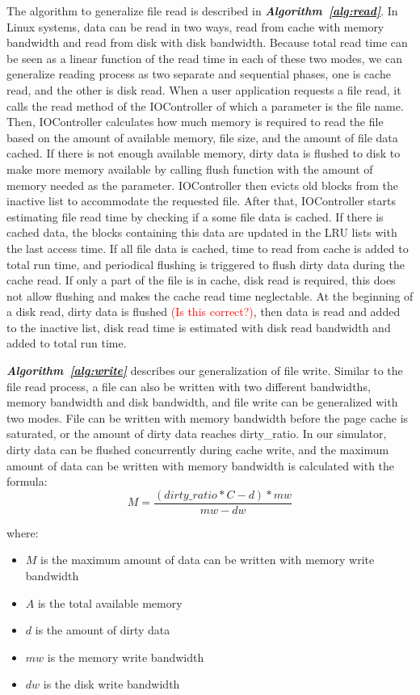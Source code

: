 \documentclass[conference]{IEEEtran}
\begin{document}
			The algorithm to generalize file read is described in \textbf{\textit{Algorithm~\ref{alg:read}}}. In Linux systems, data can be read in two ways, read from cache with memory bandwidth and read from disk with disk bandwidth. Because total read time can be seen as a linear function of the read time in each of these two modes, we can generalize reading process as two separate and sequential phases, one is cache read, and the other is disk read. When a user application requests a file read, it calls the read method of the IOController of which a parameter is the file name. Then, IOController calculates how much memory is required to read the file based on the amount of available memory, file size, and the amount of file data cached. If there is not enough available memory, dirty data is flushed to disk to make more memory available by calling flush function with the amount of memory needed as the parameter. IOController then evicts old  blocks from the inactive list to accommodate the requested file. After that, IOController starts estimating file read time by checking if a some file data is cached. If there is cached data, the blocks containing this data are  updated in the LRU lists with the last access time. If all file data is cached, time to read from cache is added to total run time, and periodical flushing is triggered to flush dirty data during the cache read. If only a part of the file is in cache, disk read is required, this does not allow flushing and makes the cache read time neglectable. At the beginning of a disk read, dirty data is flushed \textcolor{red}{(Is this correct?)}, then data is read and added to the inactive list, disk read time is estimated with disk read bandwidth and added to total run time. 			

			\textbf{\textit{Algorithm~\ref{alg:write}}} describes our generalization of file write. Similar to the file read process, a file can also be written with two different bandwidths, memory bandwidth and disk bandwidth, and file write can be generalized with two modes. File can be written with memory bandwidth before the page cache is saturated, or the amount of dirty data reaches dirty\_ratio. In our simulator, dirty data can be flushed concurrently during cache write, and the maximum amount of data can be written with memory bandwidth is calculated with the formula:
			\begin{equation}
				M = \frac{(dirty\_ratio*C - d)*mw}{mw - dw}
			\end{equation}			 			

			where:
			\begin{itemize}
				\item $M$ is the maximum amount of data can be written with memory write bandwidth
				\item $A$ is the total available memory
				\item $d$ is the amount of dirty data
				\item $mw$ is the memory write bandwidth
				\item $dw$ is the disk write bandwidth			
			\end{itemize}
			
\end{document}
